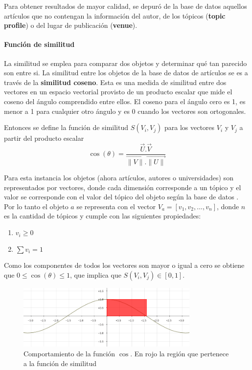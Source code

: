 Para obtener resultados de mayor calidad, se depuró de la base de datos aquellos artículos que no contengan la información del autor, de los tópicos (\textbf{topic profile}) o del lugar de publicación (\textbf{venue}). 

\paragraph{Función de similitud}
La similitud se emplea para comparar dos objetos y determinar qué tan parecido son entre si. La similitud entre los objetos de la base de datos de artículos se es a través de la \textbf{similitud coseno}. Esta es una medida de similitud entre dos vectores en un espacio vectorial provisto de un producto escalar que mide el coseno del ángulo comprendido entre ellos. El coseno para el ángulo cero es 1, es menor a 1 para cualquier otro ángulo y es 0 cuando los vectores son ortogonales. 

Entonces se define la función de similitud $S(V_i, V_j)$ para los vectores $V_i$ y $V_j$ a partir del producto escalar\\

\begin{equation} \label{eq:angulovectorial}
\cos(\theta) =  \dfrac{\overrightarrow{U} . \overrightarrow{V}}{\overrightarrow{\lVert V\lVert}.\overrightarrow{\lVert U\lVert}}
\end{equation}

Para esta instancia los objetos (ahora artículos, autores o universidades) son representados por vectores, donde cada dimensión corresponde a un tópico y el valor se corresponde con el valor del tópico del objeto según la base de datos \cite{dataDrive}. Por lo tanto el objeto $a$ se representa con el vector $V_a = [v_1,v_2,...,v_n]$, donde $n$ es la cantidad de tópicos y cumple con las siguientes propiedades:
\begin{enumerate}
 \item $v_i \geq 0$
 \item $\sum{v_i} = 1$
\end{enumerate}

Como los componentes de todos los vectores son mayor o igual a cero se obtiene que $0\leq\cos(\theta)\leq1$, que implica que $S(V_i, V_j) \in \left[0, 1\right]$.

\begin{figure}[H]
\includegraphics[width=0.8\textwidth]{img/coseno.png}
\caption{Comportamiento de la función $\cos$. En rojo la región que pertenece a la función de similitud}
\label{bus:img-coseno}
\end{figure}

